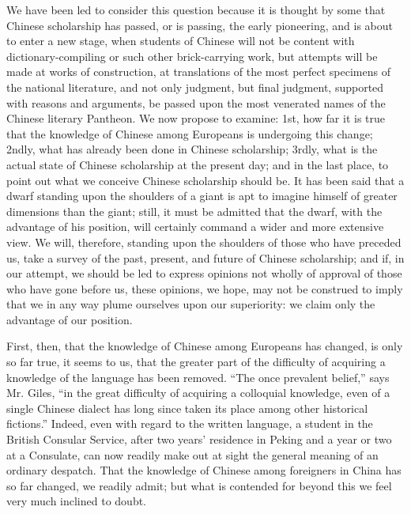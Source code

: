 We have been led to consider this question
because it is thought by some that Chinese scholarship has passed,
or is passing, the early pioneering, and is about to enter a new stage,
when students of Chinese will not be content with dictionary-compiling
or such other brick-carrying work,
but attempts will be made at works of construction,
at translations of the most perfect specimens of the national literature,
and not only judgment, but final judgment,
supported with reasons and arguments,
be passed upon the most venerated names of the Chinese literary Pantheon.
We now propose to examine:
1st, how far it is true that the knowledge of Chinese among Europeans is undergoing this change;
2ndly, what has already been done in Chinese scholarship;
3rdly, what is the actual state of Chinese scholarship at the present day; and in the last place,
to point out what we conceive Chinese scholarship should be.
It has been said that a dwarf standing upon the shoulders of a giant is apt to imagine himself of greater dimensions than the giant;
still, it must be admitted that the dwarf, with the advantage of his position,
will certainly command a wider and more extensive view.
We will, therefore, standing upon the shoulders of those who have preceded us,
take a survey of the past, present, and future of Chinese scholarship;
and if, in our attempt, we should be led to express opinions not wholly of approval of those
who have gone before us, these opinions,
we hope, may not be construed to imply that we in any way plume ourselves upon our superiority:
we claim only the advantage of our position.

First, then, that the knowledge of Chinese among Europeans has changed,
is only so far true, it seems to us,
that the greater part of the difficulty of acquiring a knowledge of the language has been removed.
``The once prevalent belief,'' says Mr. Giles,
``in the great difficulty of acquiring a colloquial knowledge,
even of a single Chinese dialect has long since taken its place among other historical fictions.''
Indeed, even with regard to the written language,
a student in the British Consular Service, after two years' residence in Peking and a year or two at a Consulate, can now readily make out at sight the general meaning of an ordinary despatch.
That the knowledge of Chinese among foreigners in China has so far changed, we readily admit;
but what is contended for beyond this we feel very much inclined to doubt.


